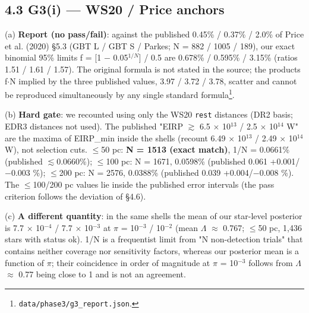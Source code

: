 \documentclass[11pt]{article}
\begin{document}
\subsection*{4.3 G3(i) --- WS20 / Price anchors}
\noindent (a) \textbf{Report (no pass/fail)}: against the published 0.45\% / 0.37\% / 2.0\% of Price et al. (2020) \S{}5.3 (GBT L / GBT S / Parkes; N = 882 / 1005 / 189), our exact binomial 95\% limits f = [1 \(-\) 0.05\(^{1/N}\)] / 0.5 are 0.678\% / 0.595\% / 3.15\% (ratios 1.51 / 1.61 / 1.57). The original formula is not stated in the source; the products f\(\cdot\)N implied by the three published values, 3.97 / 3.72 / 3.78, scatter and cannot be reproduced simultaneously by any single standard formula\footnote{\texttt{data/phase3/g3\_report.json}.}.\par\smallskip
\noindent (b) \textbf{Hard gate}: we recounted using only the WS20 \texttt{rest} distances (DR2 basis; EDR3 distances not used). The published "EIRP \(\gtrsim\) 6.5 \(\times\) 10\(^{13}\) / 2.5 \(\times\) 10\(^{14}\) W" are the maxima of EIRP\_min inside the shells (recount 6.49 \(\times\) 10\(^{13}\) / 2.49 \(\times\) 10\(^{14}\) W), not selection cuts. \(\leq\)50 pc: \textbf{N = 1513 (exact match)}, 1/N = 0.0661\% (published \(\lesssim\)0.0660\%); \(\leq\)100 pc: N = 1671, 0.0598\% (published 0.061 +0.001/\(-\)0.003 \%); \(\leq\)200 pc: N = 2576, 0.0388\% (published 0.039 +0.004/\(-\)0.008 \%). The \(\leq\)100/200 pc values lie inside the published error intervals (the pass criterion follows the deviation of \S{}4.6).\par\smallskip
\noindent (c) \textbf{A different quantity}: in the same shells the mean of our star-level posterior is 7.7 \(\times\) 10\(^{-4}\) / 7.7 \(\times\) 10\(^{-3}\) at \(\pi\) = 10\(^{-3}\) / 10\(^{-2}\) (mean \(\Lambda\) \(\approx\) 0.767; \(\leq\)50 pc, 1,436 stars with status ok). 1/N is a frequentist limit from "N non-detection trials" that contains neither coverage nor sensitivity factors, whereas our posterior mean is a function of \(\pi\); their coincidence in order of magnitude at \(\pi\) = 10\(^{-3}\) follows from \(\Lambda\) \(\approx\) 0.77 being close to 1 and is not an agreement.\par\smallskip
\end{document}
